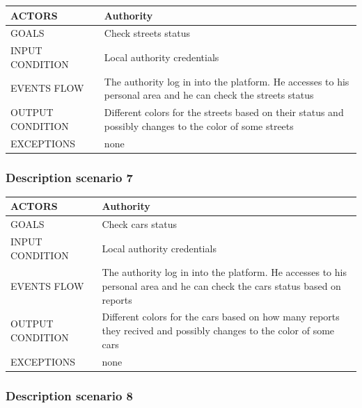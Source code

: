 \begin{center}
	\begin{tabular}{ | l | p{6cm} | } 
		\hline
		ACTORS & Authority  \\ 
		\hline
		GOALS & Check streets status  \\ 
		\hline
		INPUT CONDITION & Local authority credentials  \\ 
		\hline
		EVENTS FLOW & The authority log in into the platform. He accesses to his personal area and he can check the streets status \\ 
		\hline
		OUTPUT CONDITION & Different colors for the streets based on their status and possibly changes to the color of some streets \\ 
		\hline
		EXCEPTIONS & none \\ 
		\hline
	\end{tabular}
\end{center}

\subsubsection{Description scenario 7}

\begin{center}
	\begin{tabular}{ | l | p{6cm} | } 
		\hline
		ACTORS & Authority  \\ 
		\hline
		GOALS & Check cars status  \\ 
		\hline
		INPUT CONDITION & Local authority credentials  \\ 
		\hline
		EVENTS FLOW & The authority log in into the platform. He accesses to his personal area and he can check the cars status based on reports \\ 
		\hline
		OUTPUT CONDITION & Different colors for the cars based on how many reports they recived and possibly changes to the color of some cars \\ 
		\hline
		EXCEPTIONS & none \\ 
		\hline
	\end{tabular}
\end{center}

\subsubsection{Description scenario 8}

